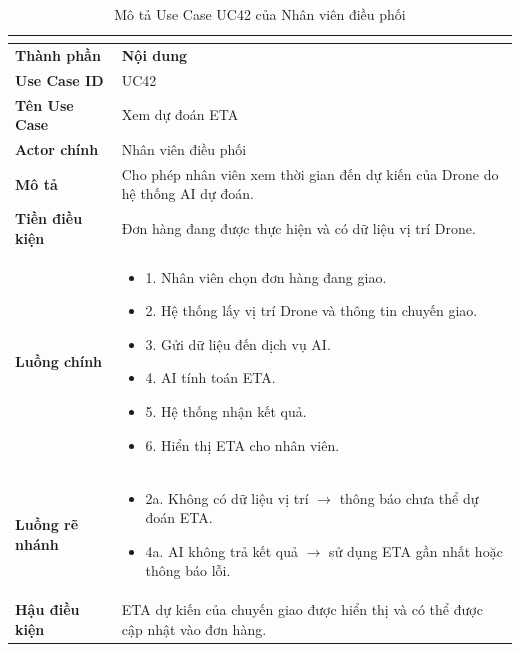 \begin{longtable}{|C{3cm}|L{11cm}|}
\caption{Mô tả Use Case UC42 của Nhân viên điều phối}\\
\label{tab:mo-ta-uc42-dieu-phoi}\\
\hline
\textbf{Thành phần} & \textbf{Nội dung} \\
\hline
\textbf{Use Case ID} & UC42 \\
\hline
\textbf{Tên Use Case} & Xem dự đoán ETA \\
\hline
\textbf{Actor chính} & Nhân viên điều phối \\
\hline
\textbf{Mô tả} &
Cho phép nhân viên xem thời gian đến dự kiến của Drone do hệ thống AI dự đoán. \\
\hline
\textbf{Tiền điều kiện} &
Đơn hàng đang được thực hiện và có dữ liệu vị trí Drone. \\
\hline
\textbf{Luồng chính} &
\begin{itemize}[leftmargin=*,topsep=2pt,itemsep=2pt]
    \item 1. Nhân viên chọn đơn hàng đang giao.
    \item 2. Hệ thống lấy vị trí Drone và thông tin chuyến giao.
    \item 3. Gửi dữ liệu đến dịch vụ AI.
    \item 4. AI tính toán ETA.
    \item 5. Hệ thống nhận kết quả.
    \item 6. Hiển thị ETA cho nhân viên.
\end{itemize} \\
\hline
\textbf{Luồng rẽ nhánh} &
\begin{itemize}[leftmargin=*,topsep=2pt,itemsep=2pt]
    \item 2a. Không có dữ liệu vị trí $\rightarrow$ thông báo chưa thể dự đoán ETA.
    \item 4a. AI không trả kết quả $\rightarrow$ sử dụng ETA gần nhất hoặc thông báo lỗi.
\end{itemize} \\
\hline
\textbf{Hậu điều kiện} &
ETA dự kiến của chuyến giao được hiển thị và có thể được cập nhật vào đơn hàng. \\
\hline
\end{longtable}


